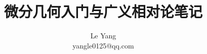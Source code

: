 \documentclass[hyperref, UTF8]{ctexbook}
\begin{document}
\title{微分几何入门与广义相对论笔记}
\author{
Le Yang\\
yangle0125@qq.com
}
\date{}
\maketitle

\tableofcontents



\end{document}
